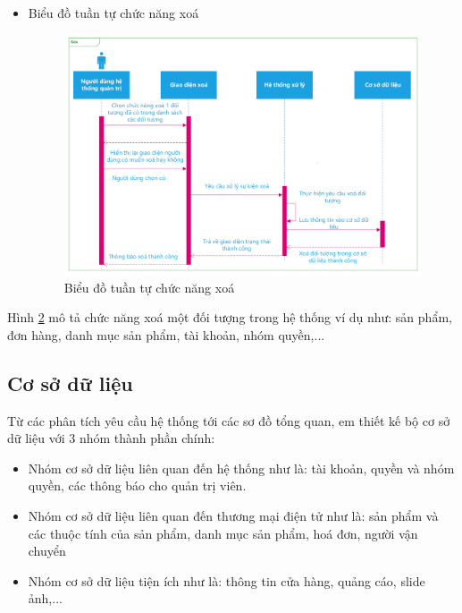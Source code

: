 \begin{itemize}
\begin{center}
\begin{figure}[h]
\begin{center}
    \end{center}
    \caption{Biểu đồ tuần tự chức năng sửa}
    \label{refhinh3_9}
    \end{figure}
\end{center}
Hình \ref{refhinh3_9} mô tả chức năng sửa một đối tượng trong hệ thống ví dụ như: sản phẩm, đơn hàng, danh mục sản phẩm, tài khoản, nhóm quyền,...
\newpage
\item Biểu đồ tuần tự chức năng xoá
\begin{center}
    \begin{figure}[h]
    \begin{center}
     \includegraphics[scale=0.65]{image/SquenceDiagramX.pdf}
    \end{center}
    \caption{Biểu đồ tuần tự chức năng xoá}
    \label{refhinh3_10}
    \end{figure}
\end{center}
\end{itemize}
Hình \ref{refhinh3_10} mô tả chức năng xoá một đối tượng trong hệ thống ví dụ như: sản phẩm, đơn hàng, danh mục sản phẩm, tài khoản, nhóm quyền,...
\subsection{Cơ sở dữ liệu}
Từ các phân tích yêu cầu hệ thống tới các sơ đồ tổng quan, em thiết kế bộ cơ sở dữ liệu với 3 nhóm thành phần chính: 
\begin{itemize}
\item Nhóm cơ sở dữ liệu liên quan đến hệ thống như là: tài khoản, quyền và nhóm quyền, các thông báo cho quản trị viên.
\item Nhóm cơ sở dữ liệu liên quan đến thương mại điện tử như là: sản phẩm và các thuộc tính của sản phẩm, danh mục sản phẩm, hoá đơn, người vận chuyển
\item Nhóm cơ sở dữ liệu tiện ích như là: thông tin cửa hàng, quảng cáo, slide ảnh,... 
\end{itemize}

